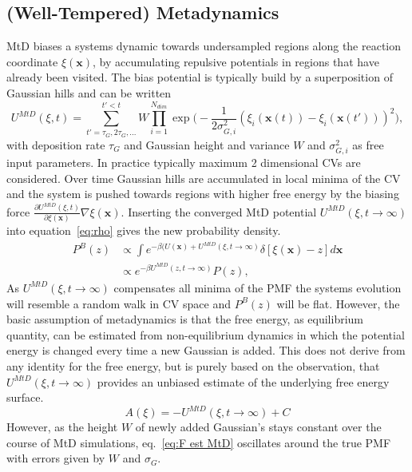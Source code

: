 \subsection{(Well-Tempered) Metadynamics}
\label{sec:metaD}
MtD biases a systems dynamic towards undersampled regions along the reaction coordinate $\xi(\textbf{x})$, by accumulating repulsive potentials in regions that have already been visited.\autocite{barducci2011metadynamics} The bias potential is typically build by a superposition of Gaussian hills and can be written
\begin{equation}
  U^{MtD}(\xi,t)= \sum_{t'=\tau_G,2\tau_G,...}^{t'<t} W \prod_{i=1}^{N_{dim}} \exp\biggr(-\frac{1}{2\sigma_{G,i}^{2}} (\xi_{i}(\textbf{x}(t))-\xi_{i}(\textbf{x}(t')))^2 \biggl),
  \label{eq:U_mtD}
\end{equation}
with deposition rate $\tau_G$ and Gaussian height and variance $W$ and $\sigma_{G,i}^2$ as free input parameters.
In practice typically maximum 2 dimensional CVs are considered.
Over time Gaussian hills are accumulated in local minima of the CV and the system is pushed towards regions with higher free energy by the biasing force $\frac{\partial U^{MtD}(\xi,t)}{\partial\xi(\textbf{x})}\nabla\xi(\textbf{x})$.
Inserting the converged MtD potential $U^{MtD}(\xi,t\to\infty)$ into equation~\ref{eq:rho} gives the new probability density.
\begin{equation}
  \begin{split}
    P^B(z) &\propto \int e^{-\beta (U(\textbf{x})+U^{MtD}(\xi,t\to\infty)}\delta[\xi(\textbf{x})-z]d\textbf{x} \\
    &\propto e^{-\beta U^{MtD}(z,t\to\infty)} P(z),
  \end{split}
\end{equation}
As $U^{MtD}(\xi,t\to\infty)$ compensates all minima of the PMF the systems evolution will resemble a random walk in CV space and $P^B(z)$ will be flat.
However, the basic assumption of metadynamics is that the free energy, as equilibrium quantity, can be estimated from non-equilibrium dynamics in which the potential energy is changed every time a new Gaussian is added.
This does not derive from any identity for the free energy, but is purely based on the observation, that $U^{MtD}(\xi,t\to\infty)$ provides an unbiased estimate of the underlying free energy surface.\autocite{bussi2006equilibrium}
\begin{equation}
  A(\xi) = -U^{MtD}(\xi, t \to \infty) + C \label{eq:F est MtD}
\end{equation}
However, as the height $W$ of newly added Gaussian's stays constant over the course of MtD simulations, eq.~\ref{eq:F est MtD} oscillates around the true PMF with errors given by $W$ and $\sigma_G$.
